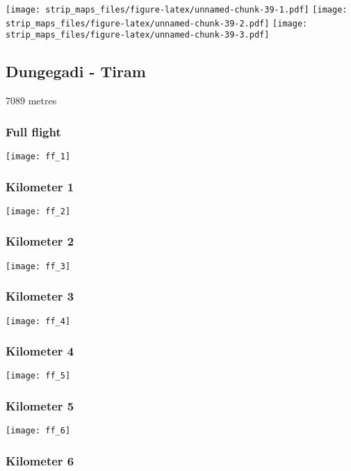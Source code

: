 \documentclass[]{article}
\begin{document}
\texttt{[image: strip\_maps\_files/figure-latex/unnamed-chunk-39-1.pdf]}
\texttt{[image: strip\_maps\_files/figure-latex/unnamed-chunk-39-2.pdf]}
\texttt{[image: strip\_maps\_files/figure-latex/unnamed-chunk-39-3.pdf]}

\newpage

\subsection{Dungegadi - Tiram}\label{dungegadi---tiram}

7089 metres

\subsubsection{Full flight}\label{full-flight-31}

\texttt{[image: ff\_1]}

\subsubsection{Kilometer 1}\label{kilometer-1-31}

\texttt{[image: ff\_2]}

\subsubsection{Kilometer 2}\label{kilometer-2-31}

\texttt{[image: ff\_3]}

\subsubsection{Kilometer 3}\label{kilometer-3-31}

\texttt{[image: ff\_4]}

\subsubsection{Kilometer 4}\label{kilometer-4-30}

\texttt{[image: ff\_5]}

\subsubsection{Kilometer 5}\label{kilometer-5-25}

\texttt{[image: ff\_6]}

\subsubsection{Kilometer 6}\label{kilometer-6-20}
\end{document}
